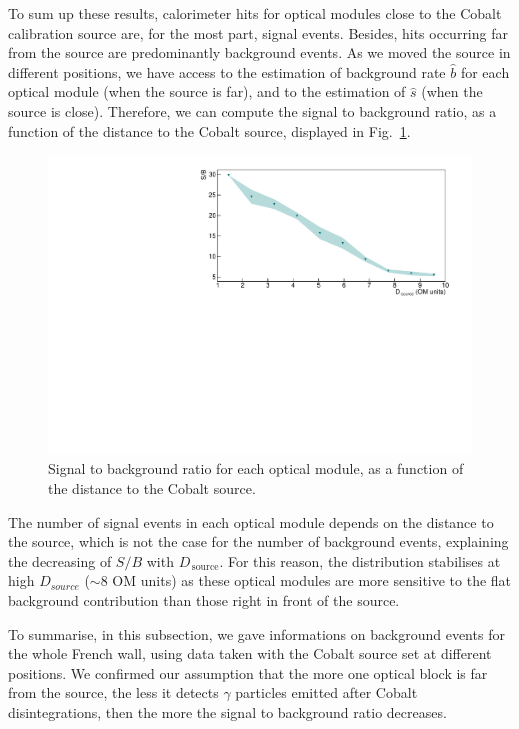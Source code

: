 To sum up these results, calorimeter hits for optical modules close to the Cobalt calibration source are, for the most part, signal events.
Besides, hits occurring far from the source are predominantly background events.
As we moved the source in different positions, we have access to the estimation of background rate $\hat{b}$ for each optical module (when the source is far), and to the estimation of $\hat{s}$ (when the source is close).
Therefore, we can compute the signal to background ratio, as a function of the distance to the Cobalt source, displayed in Fig.~\ref{fig:Co_ratioSB}.
\begin{figure}[h]
  \centering
  \includegraphics[width=1.1\textwidth]{commissioning/fig_commissioning/Co_ratioSB_distance.pdf}
  \caption{Signal to background ratio for each optical module, as a function of the distance to the Cobalt source.
    \label{fig:Co_ratioSB}}
\end{figure}
The number of signal events in each optical module depends on the distance to the source, which is not the case for the number of background events, explaining the decreasing of $S/B$ with $D_{\,\text{source}}$.
For this reason, the distribution stabilises at high $D_{source}$ ($\sim8$ OM units) as these optical modules are more sensitive to the flat background contribution than those right in front of the source.

To summarise, in this subsection, we gave informations on background events for the whole French wall, using data taken with the Cobalt source set at different positions.
We confirmed our assumption that the more one optical block is far from the source, the less it detects $\gamma$ particles emitted after Cobalt disintegrations, then the more the signal to background ratio decreases.

